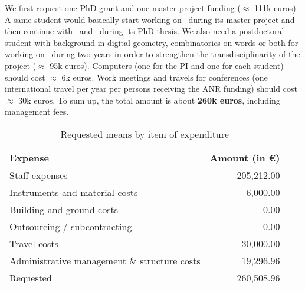 
We first request one PhD grant and one master project funding ($\approx$ 111k euros). A same student would basically start working on \wpPPA~during its master project and then continue with \wpEstim~and \wpScale~during its PhD thesis. We also need a postdoctoral student with background in digital geometry, combinatorics on words or both for working on \wpPattern~during two years in order to strengthen the transdisciplinarity of the project ($\approx$ 95k euros). 
Computers (one for the PI and one for each student) should cost $\approx$ 6k euros. Work meetings and travels for conferences (one international travel per year per persons receiving the ANR funding) should cost $\approx$ 30k euros. 
To sum up, the total amount is about \textbf{260k euros}, including management fees. 


\begin{table}[htbp]
  \caption{Requested means by item of expenditure}
  \centering
  \begin{tabular}{|l|r|}
    \hline 
    Expense                                      & Amount (in \euro) \\ \hline \hline
    Staff expenses                               & 205,212.00 \\ \hline
    Instruments and material costs               & 6,000.00  \\ \hline
    Building and ground costs                    & 0.00  \\ \hline
    Outsourcing / subcontracting                 & 0.00 \\ \hline
    Travel costs                                 & 30,000.00  \\  \hline
    Administrative management \& structure costs & 19,296.96 \\ \hline
    Requested                                    & 260,508.96 \\ \hline
    \hline
  \end{tabular}
  \label{tab:grant}
\end{table}
